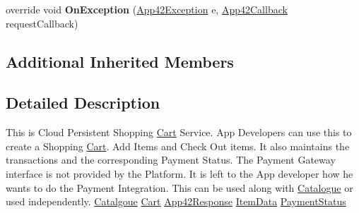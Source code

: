\begin{DoxyCompactItemize}
\item 
\hypertarget{classcom_1_1shephertz_1_1app42_1_1paas_1_1sdk_1_1windows_1_1shopping_1_1_cart_service_aae772fa2546a02ccc52f61c6c8728852}{override void {\bfseries On\+Exception} (\hyperlink{classcom_1_1shephertz_1_1app42_1_1paas_1_1sdk_1_1windows_1_1_app42_exception}{App42\+Exception} e, \hyperlink{interfacecom_1_1shephertz_1_1app42_1_1paas_1_1sdk_1_1windows_1_1_app42_callback}{App42\+Callback} request\+Callback)}\label{classcom_1_1shephertz_1_1app42_1_1paas_1_1sdk_1_1windows_1_1shopping_1_1_cart_service_aae772fa2546a02ccc52f61c6c8728852}

\end{DoxyCompactItemize}
\subsection*{Additional Inherited Members}


\subsection{Detailed Description}
This is Cloud Persistent Shopping \hyperlink{classcom_1_1shephertz_1_1app42_1_1paas_1_1sdk_1_1windows_1_1shopping_1_1_cart}{Cart} Service. App Developers can use this to create a Shopping \hyperlink{classcom_1_1shephertz_1_1app42_1_1paas_1_1sdk_1_1windows_1_1shopping_1_1_cart}{Cart}. Add Items and Check Out items. It also maintains the transactions and the corresponding Payment Status. The Payment Gateway interface is not provided by the Platform. It is left to the App developer how he wants to do the Payment Integration. This can be used along with \hyperlink{classcom_1_1shephertz_1_1app42_1_1paas_1_1sdk_1_1windows_1_1shopping_1_1_catalogue}{Catalogue} or used independently. \hyperlink{classcom_1_1shephertz_1_1app42_1_1paas_1_1sdk_1_1windows_1_1shopping_1_1_cart_service}{Catalgoue} \hyperlink{classcom_1_1shephertz_1_1app42_1_1paas_1_1sdk_1_1windows_1_1shopping_1_1_cart_service}{Cart} \hyperlink{classcom_1_1shephertz_1_1app42_1_1paas_1_1sdk_1_1windows_1_1shopping_1_1_cart_service}{App42\+Response} \hyperlink{classcom_1_1shephertz_1_1app42_1_1paas_1_1sdk_1_1windows_1_1shopping_1_1_cart_service}{Item\+Data} \hyperlink{classcom_1_1shephertz_1_1app42_1_1paas_1_1sdk_1_1windows_1_1shopping_1_1_cart_service}{Payment\+Status} 



